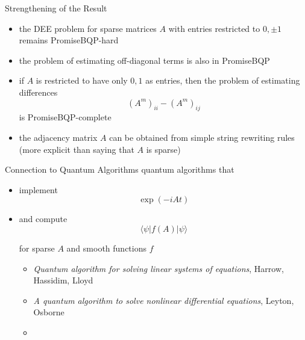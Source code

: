 \documentclass[slideColor]{prosper}
\renewcommand{\>}{\rangle}
\newcommand{\<}{\langle}
\begin{document}

\begin{slide}{Strengthening of the Result}

\begin{itemize}
\item the DEE problem for sparse matrices $A$ with entries restricted to $0,\pm 1$ remains PromiseBQP-hard

\medskip
\item the problem of estimating off-diagonal terms is also in PromiseBQP

\medskip
\item if $A$ is restricted to have only $0,1$ as entries, then the problem of estimating differences
\[
(A^m)_{ii} - (A^m)_{ij}
\]
is PromiseBQP-complete

\medskip
\item the adjacency matrix $A$ can be obtained from simple string rewriting rules (more explicit than saying that $A$ is sparse)
\end{itemize}

\end{slide}


\begin{slide}{Connection to Quantum Algorithms}
quantum algorithms that 

\begin{itemize}
\item implement 
\[
\exp(-i A t)
\]

\medskip
\item and compute
\[
\<\psi|f(A)|\psi\>
\]

\medskip
for sparse $A$ and smooth functions $f$

\medskip
\begin{itemize}
\item {\em Quantum algorithm for solving linear systems of equations}, Harrow, Hassidim, Lloyd

\medskip
\item {\em A quantum algorithm to solve nonlinear differential equations}, Leyton, Osborne

\medskip
\item
\end{itemize}
\end{itemize}
\end{slide}

\end{document}
